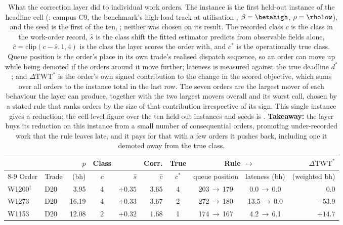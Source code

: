 \begin{table}[pos=htbp]
\caption{What the correction layer did to individual work orders. The instance
is the first held-out instance of the headline cell (\CaseInstance{}: campus C9,
the benchmark's high-load track at utilisation \utilsat{}, $\beta=\betahigh$,
$\rho=\rholow$), and the seed is the first of the ten, \seedlo{}; neither was
chosen on its result. The recorded class $c$ is the class in the work-order
record, $\hat{s}$ is the class shift the fitted estimator predicts from
observable fields alone, $\hat{c}=\mathrm{clip}(c-\hat{s},1,4)$ is the class the
layer scores the order with, and $c^*$ is the operationally true class. Queue
position is the order's place in its own trade's realised dispatch sequence, so
an order can move up while being demoted if the orders around it move further;
lateness is measured against the true deadline $d^*$; and $\Delta\mathrm{TWT}^*$
is the order's own signed contribution to the change in the scored objective,
which sums over all \CaseNOrders{} orders to the instance total in the last row.
The seven orders are the largest mover of each behaviour the layer can produce,
together with the two largest movers overall and its worst call, chosen by a
stated rule that ranks orders by the size of that contribution irrespective of
its sign. This single instance gives a \CaseGain{} reduction; the cell-level
figure over the ten held-out instances and \nseeds{} seeds is \MzeroGain{}.
\textbf{Takeaway:} the layer buys its \CaseGain{} reduction on this instance from
a small number of consequential orders, promoting under-recorded work that the
rule leaves late, and it pays for that with a few orders it pushes back,
including one it demoted away from the true class.}
\label{tab:caseout}
\centering
\footnotesize
\begin{tabular}{@{} l l r c r r c c c r @{}}
\toprule
      &       & $p$  & Class &           & Corr.     & True  & \multicolumn{2}{c}{Rule $\to$ \mname{}} & $\Delta\mathrm{TWT}^*$ \\
\cmidrule(lr){8-9}
Order & Trade & (bh) & $c$   & $\hat{s}$ & $\hat{c}$ & $c^*$ & queue position & lateness (bh) & (weighted bh) \\
\midrule
W1200$^{\dagger}$ & D20 & 3.95 & 4 & $+0.35$ & 3.65 & 4 & 203\,$\to$\,179 & 0.0\,$\to$\,0.0 & $0.0$ \\
W1273 & D20 & 16.19 & 4 & $+0.33$ & 3.67 & 2 & 272\,$\to$\,180 & 13.5\,$\to$\,0.0 & $-53.9$ \\
W1153 & D20 & 12.08 & 2 & $+0.32$ & 1.68 & 1 & 174\,$\to$\,167 & 4.2\,$\to$\,6.1 & $+14.7$ \\

\end{tabular}
\end{table}
